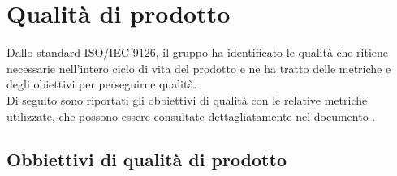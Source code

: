 \section{Qualità di prodotto}

Dallo standard ISO/IEC 9126, il gruppo \Gruppo{} ha identificato le qualità che ritiene necessarie nell'intero ciclo di vita del prodotto e ne ha tratto delle metriche e degli obiettivi per perseguirne qualità.\\
Di seguito sono riportati gli obbiettivi di qualità con le relative metriche utilizzate, che possono essere consultate dettagliatamente nel documento .


\subsection{Obbiettivi di qualità di prodotto}
